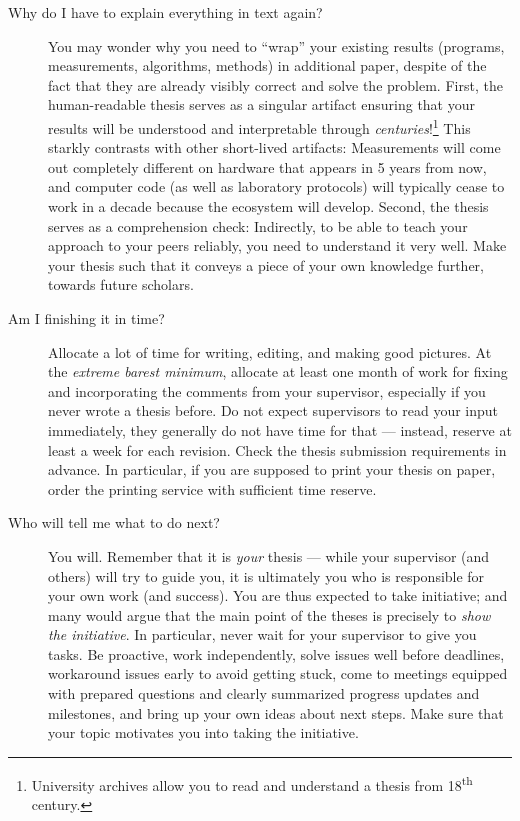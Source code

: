 \begin{description}
\item[Why do I have to explain everything in text again?]
You may wonder why you need to ``wrap'' your existing results (programs, measurements, algorithms, methods) in additional paper, despite of the fact that they are already visibly correct and solve the problem. First, the human-readable thesis serves as a singular artifact ensuring that your results will be understood and interpretable through \emph{centuries}!\footnote{University archives allow you to read and understand a thesis from 18\textsuperscript{th} century.} This starkly contrasts with other short-lived artifacts: Measurements will come out completely different on hardware that appears in 5 years from now, and computer code (as well as laboratory protocols) will typically cease to work in a decade because the ecosystem will develop. Second, the thesis serves as a comprehension check: Indirectly, to be able to teach your approach to your peers reliably, you need to understand it very well. Make your thesis such that it conveys a piece of your own knowledge further, towards future scholars.
\item[Am I finishing it in time?]
Allocate a lot of time for writing, editing, and making good pictures. At the \emph{extreme barest minimum}, allocate at least one month of work for fixing and incorporating the comments from your supervisor, especially if you never wrote a thesis before. Do not expect supervisors to read your input immediately, they generally do not have time for that --- instead, reserve at least a week for each revision. Check the thesis submission requirements in advance. In particular, if you are supposed to print your thesis on paper, order the printing service with sufficient time reserve.
\item[Who will tell me what to do next?]
You will. Remember that it is \emph{your} thesis --- while your supervisor (and others) will try to guide you, it is ultimately you who is responsible for your own work (and success). You are thus expected to take initiative; and many would argue that the main point of the theses is precisely to \emph{show the initiative}. In particular, never wait for your supervisor to give you tasks. Be proactive, work independently, solve issues well before deadlines, workaround issues early to avoid getting stuck, come to meetings equipped with prepared questions and clearly summarized progress updates and milestones, and bring up your own ideas about next steps. Make sure that your topic motivates you into taking the initiative.
\end{description}

